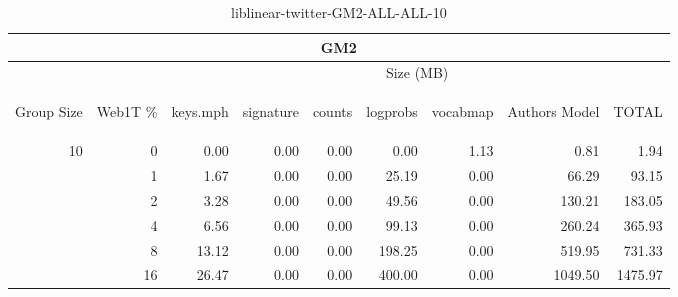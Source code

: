 \begin{center}
\begin{table}[htbp]
\begin{tabular}{ | r | r | r | r | r | r | r | r | r |}
\hline
\multicolumn{9}{|c|}{GM2}\\
\hline
 & & \multicolumn{7}{|c|}{Size (MB)}\\ \cline{3-9}
\begin{sideways}Group Size\end{sideways} & \begin{sideways}Web1T \% \end{sideways} & \begin{sideways}keys.mph\end{sideways} & \begin{sideways}signature\end{sideways} & \begin{sideways}counts\end{sideways} & \begin{sideways}logprobs\end{sideways} & \begin{sideways}vocabmap\end{sideways} & \begin{sideways}Authors Model \end{sideways} & \begin{sideways}TOTAL\end{sideways}\\
\hline
\multirow{5}{*}{10}
 & 0 & 0.00 & 0.00 & 0.00 & 0.00 & 1.13 & 0.81 & 1.94\\ \cline{2-9}
 & 1 & 1.67 & 0.00 & 0.00 & 25.19 & 0.00 & 66.29 & 93.15\\ \cline{2-9}
 & 2 & 3.28 & 0.00 & 0.00 & 49.56 & 0.00 & 130.21 & 183.05\\ \cline{2-9}
 & 4 & 6.56 & 0.00 & 0.00 & 99.13 & 0.00 & 260.24 & 365.93\\ \cline{2-9}
 & 8 & 13.12 & 0.00 & 0.00 & 198.25 & 0.00 & 519.95 & 731.33\\ \cline{2-9}
 & 16 & 26.47 & 0.00 & 0.00 & 400.00 & 0.00 & 1049.50 & 1475.97\\ \cline{2-9}
\hline
\end{tabular}
\caption{liblinear-twitter-GM2-ALL-ALL-10}
\label{table:liblinear-twitter-GM2-ALL-ALL-10}
\end{table}
\end{center}

